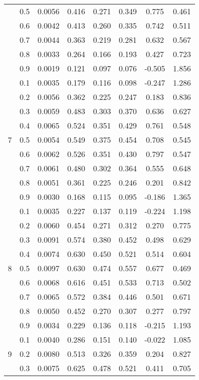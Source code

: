 \documentclass[11pt,a4paper]{report}
\begin{document}
\begin{longtable}{ | c | c || c | c | c | c | c | c | }
 & 0.5 & 0.0056 & 0.416 & 0.271 & 0.349 & 0.775 & 0.461 \\
 & 0.6 & 0.0042 & 0.413 & 0.260 & 0.335 & 0.742 & 0.511 \\
 & 0.7 & 0.0044 & 0.363 & 0.219 & 0.281 & 0.632 & 0.567 \\
 & 0.8 & 0.0033 & 0.264 & 0.166 & 0.193 & 0.427 & 0.723 \\
 & 0.9 & 0.0019 & 0.121 & 0.097 & 0.076 & -0.505 & 1.856 \\
 \hline
\multirow{9}{*}{7} & 0.1 & 0.0035 & 0.179 & 0.116 & 0.098 & -0.247 & 1.286 \\
 & 0.2 & 0.0056 & 0.362 & 0.225 & 0.247 & 0.183 & 0.836 \\
 & 0.3 & 0.0059 & 0.483 & 0.303 & 0.370 & 0.636 & 0.627 \\
 & 0.4 & 0.0065 & 0.524 & 0.351 & 0.429 & 0.761 & 0.548 \\
 & 0.5 & 0.0054 & 0.549 & 0.375 & 0.454 & 0.708 & 0.545 \\
 & 0.6 & 0.0062 & 0.526 & 0.351 & 0.430 & 0.797 & 0.547 \\
 & 0.7 & 0.0061 & 0.480 & 0.302 & 0.364 & 0.555 & 0.648 \\
 & 0.8 & 0.0051 & 0.361 & 0.225 & 0.246 & 0.201 & 0.842 \\
 & 0.9 & 0.0030 & 0.168 & 0.115 & 0.095 & -0.186 & 1.365 \\
 \hline
\multirow{9}{*}{8} & 0.1 & 0.0035 & 0.227 & 0.137 & 0.119 & -0.224 & 1.198 \\
 & 0.2 & 0.0060 & 0.454 & 0.271 & 0.312 & 0.270 & 0.775 \\
 & 0.3 & 0.0091 & 0.574 & 0.380 & 0.452 & 0.498 & 0.629 \\
 & 0.4 & 0.0074 & 0.630 & 0.450 & 0.521 & 0.514 & 0.604 \\
 & 0.5 & 0.0097 & 0.630 & 0.474 & 0.557 & 0.677 & 0.469 \\
 & 0.6 & 0.0068 & 0.616 & 0.451 & 0.533 & 0.713 & 0.502 \\
 & 0.7 & 0.0065 & 0.572 & 0.384 & 0.446 & 0.501 & 0.671 \\
 & 0.8 & 0.0050 & 0.452 & 0.270 & 0.307 & 0.277 & 0.797 \\
 & 0.9 & 0.0034 & 0.229 & 0.136 & 0.118 & -0.215 & 1.193 \\
 \hline
\multirow{9}{*}{9} & 0.1 & 0.0040 & 0.286 & 0.151 & 0.140 & -0.022 & 1.085 \\
 & 0.2 & 0.0080 & 0.513 & 0.326 & 0.359 & 0.204 & 0.827 \\
 & 0.3 & 0.0075 & 0.625 & 0.478 & 0.521 & 0.411 & 0.705 \\

\end{longtable}
\end{document}
